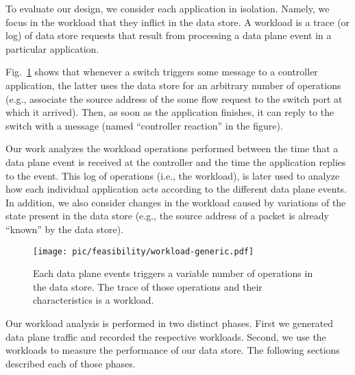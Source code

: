 
To evaluate our design, we consider each application in isolation.
Namely, we focus in the workload that they inflict in the data store. A workload is a trace (or log) of data store requests that result from processing a data plane event in a particular application. 

Fig.~\ref{fig:feasibility:workloads} shows that whenever a switch triggers some message to a controller application, the latter uses the data store for an arbitrary number of operations (e.g., associate the source address of the some flow request to the switch port at which it arrived). 
Then, as soon as the application finishes, it can reply to the switch with a message (named ``controller reaction'' in the figure). 

Our work analyzes the workload operations performed between the time that a data plane event is received at the controller and the time the application replies to the event. 
This log of operations (i.e., the workload), is later used to analyze how  each individual application acts according to the different data plane events. 
In addition, we also consider changes in the workload caused by variations of the state present in the data store (e.g., the source address of a packet is already ``known'' by the data store).

\label{sec:workload-generation}
\begin{figure}[ht]
  \centering
  \texttt{[image: pic/feasibility/workload-generic.pdf]}   
  \caption[Workload definition]{Each data plane events triggers a variable number of operations in the data store. The trace of those operations and their characteristics is a workload.}
  \label{fig:feasibility:workloads}
\end{figure}

Our workload analysis is performed in two distinct phases. 
First we generated data plane traffic and recorded the respective workloads.  
Second, we use the workloads to measure the performance of our data store. The following sections described each of those phases. 


